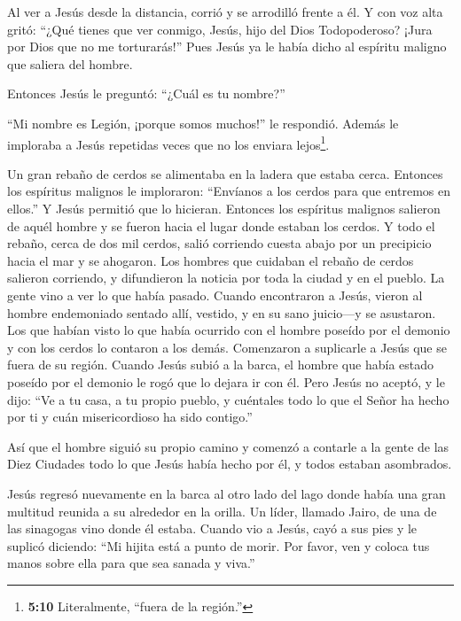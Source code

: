  Al ver a Jesús desde la distancia, corrió y se arrodilló
frente a él.  Y con voz alta gritó: ``¿Qué tienes que ver
conmigo, Jesús, hijo del Dios Todopoderoso? ¡Jura por Dios que no me
torturarás!''  Pues Jesús ya le había dicho al espíritu
maligno que saliera del hombre.

 Entonces Jesús le preguntó: ``¿Cuál es tu nombre?''

``Mi nombre es Legión, ¡porque somos muchos!'' le respondió.
 Además le imploraba a Jesús repetidas veces que no los
enviara lejos\footnote{\textbf{5:10} Literalmente, ``fuera de la
  región.''}.

 Un gran rebaño de cerdos se alimentaba en la ladera que
estaba cerca.  Entonces los espíritus malignos le
imploraron: ``Envíanos a los cerdos para que entremos en ellos.''
 Y Jesús permitió que lo hicieran. Entonces los espíritus
malignos salieron de aquél hombre y se fueron hacia el lugar donde
estaban los cerdos. Y todo el rebaño, cerca de dos mil cerdos, salió
corriendo cuesta abajo por un precipicio hacia el mar y se ahogaron.
 Los hombres que cuidaban el rebaño de cerdos salieron
corriendo, y difundieron la noticia por toda la ciudad y en el pueblo.
La gente vino a ver lo que había pasado.  Cuando
encontraron a Jesús, vieron al hombre endemoniado sentado allí, vestido,
y en su sano juicio---y se asustaron.  Los que habían visto
lo que había ocurrido con el hombre poseído por el demonio y con los
cerdos lo contaron a los demás.  Comenzaron a suplicarle a
Jesús que se fuera de su región.  Cuando Jesús subió a la
barca, el hombre que había estado poseído por el demonio le rogó que lo
dejara ir con él.  Pero Jesús no aceptó, y le dijo: ``Ve a
tu casa, a tu propio pueblo, y cuéntales todo lo que el Señor ha hecho
por ti y cuán misericordioso ha sido contigo.''

 Así que el hombre siguió su propio camino y comenzó a
contarle a la gente de las Diez Ciudades todo lo que Jesús había hecho
por él, y todos estaban asombrados.

 Jesús regresó nuevamente en la barca al otro lado del lago
donde había una gran multitud reunida a su alrededor en la orilla.
 Un líder, llamado Jairo, de una de las sinagogas vino
donde él estaba. Cuando vio a Jesús, cayó a sus pies  y le
suplicó diciendo: ``Mi hijita está a punto de morir. Por favor, ven y
coloca tus manos sobre ella para que sea sanada y viva.''

